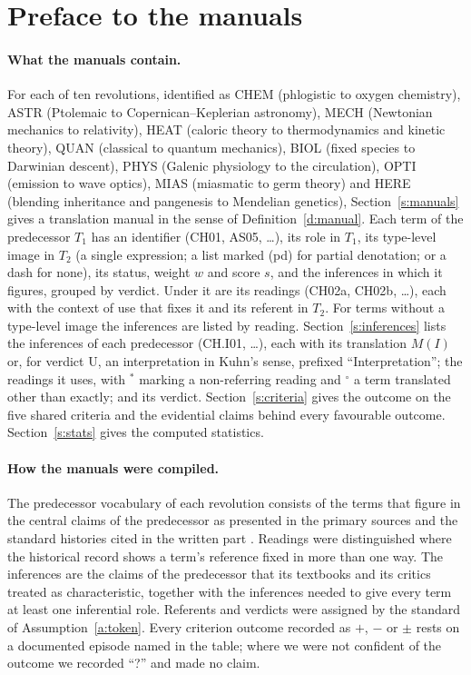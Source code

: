 \documentclass{situationist-preprint}
\begin{document}
\section{Preface to the manuals}\label{s:preface}

\paragraph{What the manuals contain.} For each of ten revolutions, identified as CHEM (phlogistic to oxygen chemistry), ASTR (Ptolemaic to Copernican--Keplerian astronomy), MECH (Newtonian mechanics to relativity), HEAT (caloric theory to thermodynamics and kinetic theory), QUAN (classical to quantum mechanics), BIOL (fixed species to Darwinian descent), PHYS (Galenic physiology to the circulation), OPTI (emission to wave optics), MIAS (miasmatic to germ theory) and HERE (blending inheritance and pangenesis to Mendelian genetics), Section~\ref{s:manuals} gives a translation manual in the sense of Definition~\ref{d:manual}. Each term of the predecessor $T_1$ has an identifier (CH01, AS05, \ldots), its role in $T_1$, its type-level image in $T_2$ (a single expression; a list marked (pd) for partial denotation; or a dash for none), its status, weight $w$ and score $s$, and the inferences in which it figures, grouped by verdict. Under it are its readings (CH02a, CH02b, \ldots), each with the context of use that fixes it and its referent in $T_2$. For terms without a type-level image the inferences are listed by reading. Section~\ref{s:inferences} lists the inferences of each predecessor (CH.I01, \ldots), each with its translation $M(I)$ or, for verdict U, an interpretation in Kuhn's sense, prefixed \enquote{Interpretation}; the readings it uses, with $^{\ast}$ marking a non-referring reading and $^{\circ}$ a term translated other than exactly; and its verdict. Section~\ref{s:criteria} gives the outcome on the five shared criteria and the evidential claims behind every favourable outcome. Section~\ref{s:stats} gives the computed statistics.

\paragraph{How the manuals were compiled.} The predecessor vocabulary of each revolution consists of the terms that figure in the central claims of the predecessor as presented in the primary sources and the standard histories cited in the written part \citep{Kuhn1957,Fox1971,Buchwald1989,Jammer1966,Ruse1979,French1994,Musgrave1976}. Readings were distinguished where the historical record shows a term's reference fixed in more than one way. The inferences are the claims of the predecessor that its textbooks and its critics treated as characteristic, together with the inferences needed to give every term at least one inferential role. Referents and verdicts were assigned by the standard of Assumption~\ref{a:token}. Every criterion outcome recorded as $+$, $-$ or $\pm$ rests on a documented episode named in the table; where we were not confident of the outcome we recorded \enquote{?} and made no claim.
\end{document}
